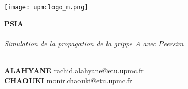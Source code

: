 \begin{titlepage}
	\begin{flushleft}
		\vspace{3mm}
		\texttt{[image: upmclogo\_m.png]}\\
	\end{flushleft}
	\vfil
	\vfil
	
	\begin{center}
		\Huge\textbf{{PSIA}}\\
		\hrulefill\\
		\Huge\textit{{Simulation de la propagation de la grippe A avec Peersim}}\\
	\end{center}
	\hrulefill\\
	\vfil
	\noindent \textbf{ALAHYANE} 
	\hfill 
	\href{mailto:rachid.alahyane@etu.upmc.fr}{rachid.alahyane@etu.upmc.fr}\\ 
	\textbf{CHAOUKI} 
	\hfill 
	\href{mailto:monir.chaouki@etu.upmc.fr}{monir.chaouki@etu.upmc.fr}\\
        \vfil
	\begin{center}	
	\end{center}
\end{titlepage}




